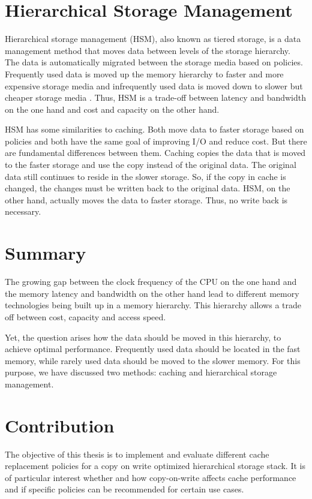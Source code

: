 \documentclass[
	12pt,
	a4paper,
	abstract,
	bibliography=totoc,
	chapterprefix,
	headings=openright,
	numbers=endperiod,
	parskip=half,
	twoside,
]{scrreprt}
\begin{document}
\section{Hierarchical Storage Management}

Hierarchical storage management (HSM), also known as tiered storage, 
is a data management method that moves data between levels of the storage hierarchy.
The data is automatically migrated between the storage media based on policies.
Frequently used data is moved up the memory hierarchy to faster and more expensive 
storage media and infrequently used data is moved down to slower but cheaper storage media 
\cite{lugar2001hierarchical}.
Thus, HSM is a trade-off between latency and bandwidth on the one hand 
and cost and capacity on the other hand.

HSM has some similarities to caching.
Both move data to faster storage based on policies and both have the same goal of improving I/O 
and reduce cost.
But there are fundamental differences between them.
Caching copies the data that is moved to the faster storage and use the copy instead of the original data. 
The original data still continues to reside in the slower storage.
So, if the copy in cache is changed, the changes must be written back to the original data.
HSM, on the other hand, actually moves the data to faster storage.
Thus, no write back is necessary.

\section{Summary}

The growing gap between the clock frequency of the CPU on the one hand and 
the memory latency and bandwidth on the other hand lead to different memory technologies 
being built up in a memory hierarchy.
This hierarchy allows a trade off between cost, capacity and access speed.

Yet, the question arises how the data should be moved in this hierarchy, to achieve optimal performance.
Frequently used data should be located in the fast memory, while rarely used data should be moved to the slower memory.
For this purpose, we have discussed two methods: caching and hierarchical storage management.

\section{Contribution}

The objective of this thesis is to implement and evaluate different cache replacement policies 
for a copy on write optimized hierarchical storage stack.
It is of particular interest whether and how copy-on-write affects cache performance and 
if specific policies can be recommended for certain use cases.
\end{document}
